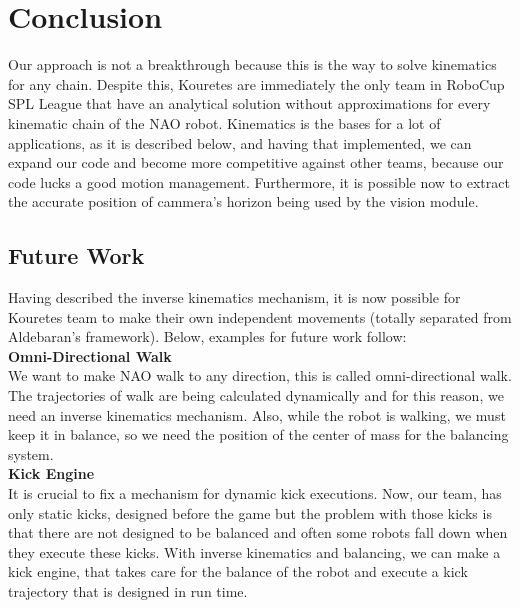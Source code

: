 \chapter{Conclusion}
\label{conclusion}
Our approach is not a breakthrough because this is the way to solve kinematics for any chain. Despite this, Kouretes are immediately the only team in RoboCup SPL League that have an analytical solution without approximations for every kinematic chain of the NAO robot. Kinematics is the bases for a lot of applications, as it is described below, and having that implemented, we can expand our code and become more competitive against other teams, because our code lucks a good motion management. Furthermore, it is possible now to extract the accurate position of cammera's horizon being used by the vision module.  
\section{Future Work}
Having described the inverse kinematics mechanism, it is now possible for Kouretes team to make their own independent movements (totally separated from Aldebaran's framework). Below, examples for future work follow:\\

\textbf{Omni-Directional Walk}\\
We want to make NAO walk to any direction, this is called omni-directional walk. The trajectories of walk are being calculated dynamically and for this reason, we need an inverse kinematics mechanism. Also, while the robot is walking, we must keep it in balance, so we need the position of the center of mass for the balancing system.\\

\textbf{Kick Engine}\\
It is crucial to fix a mechanism for dynamic kick executions. Now, our team, has only static kicks, designed before the game but the problem with those kicks is that there are not designed to be balanced and often some robots fall down when they execute these kicks. With inverse kinematics and balancing, we can make a kick engine, that takes care for the balance of the robot and execute a kick trajectory that is designed in run time.
